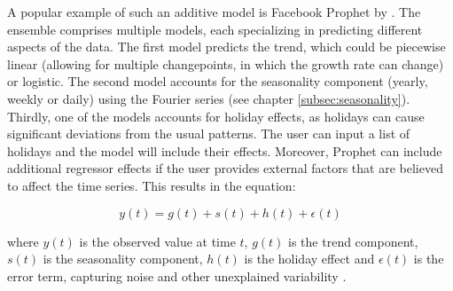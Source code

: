 A popular example of such an additive model is Facebook Prophet by \textcite{prophetpaper}.
The ensemble comprises multiple models, each specializing in predicting different aspects of the data.
The first model predicts the trend, which could be piecewise linear (allowing for multiple
changepoints, in which the growth rate can change) or logistic. The second model accounts
for the seasonality component (yearly, weekly or daily) using the Fourier series (see
chapter \ref{subsec:seasonality}). Thirdly, one of the models accounts for holiday effects,
as holidays can cause significant deviations from the usual patterns. The user can input a
list of holidays and the model will include their effects. Moreover, Prophet can include
additional regressor effects if the user provides external factors that are believed to
affect the time series. This results in the equation:

$$y(t) = g(t)+s(t)+h(t)+\epsilon(t)$$

where $y(t)$ is the observed value at time $t$, $g(t)$ is the trend component, $s(t)$ is
the seasonality component, $h(t)$ is the holiday effect and $\epsilon(t)$ is the error term,
capturing noise and other unexplained variability \parencite{prophetpaper}.

